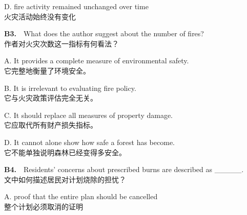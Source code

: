 \documentclass[a4paper,11pt,openany]{report}
\newcommand{\zhline}[1]{{\CJKsf\color{bodygrey}#1}}
\begin{document}
\begin{samepage}
D. fire activity remained unchanged over time\\
\zhline{火灾活动始终没有变化}
\par\end{samepage}

\begin{samepage}
\textbf{B3.}　What does the author suggest about the number of fires?\\
\zhline{作者对火灾次数这一指标有何看法？}
\par\end{samepage}

\begin{samepage}
A. It provides a complete measure of environmental safety.\\
\zhline{它完整地衡量了环境安全。}
\par\end{samepage}

\begin{samepage}
B. It is irrelevant to evaluating fire policy.\\
\zhline{它与火灾政策评估完全无关。}
\par\end{samepage}

\begin{samepage}
C. It should replace all measures of property damage.\\
\zhline{它应取代所有财产损失指标。}
\par\end{samepage}

\begin{samepage}
D. It cannot alone show how safe a forest has become.\\
\zhline{它不能单独说明森林已经变得多安全。}
\par\end{samepage}

\begin{samepage}
\textbf{B4.}　Residents' concerns about prescribed burns are described as \_\_\_\_\_.\\
\zhline{文中如何描述居民对计划烧除的担忧？}
\par\end{samepage}

\begin{samepage}
A. proof that the entire plan should be cancelled\\
\zhline{整个计划必须取消的证明}
\par\end{samepage}
\end{document}
